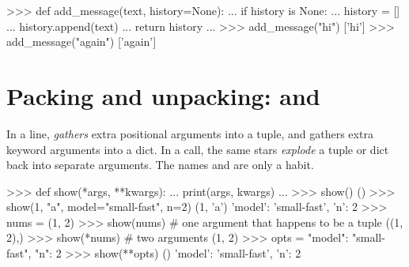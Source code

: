 \begin{pycode}
>>> def add_message(text, history=None):
...     if history is None:
...         history = []
...     history.append(text)
...     return history
...
>>> add_message("hi")
['hi']
>>> add_message("again")
['again']
\end{pycode}

\section{Packing and unpacking:  and }

In a  line,  \emph{gathers} extra positional arguments into a tuple, and
 gathers extra keyword arguments into a dict. In a call, the same stars
\emph{explode} a tuple or dict back into separate arguments. The names  and
 are only a habit.

\begin{center}
\end{center}

\begin{pycode}
>>> def show(*args, **kwargs):
...     print(args, kwargs)
...
>>> show()
() {}
>>> show(1, "a", model="small-fast", n=2)
(1, 'a') {'model': 'small-fast', 'n': 2}
>>> nums = (1, 2)
>>> show(nums)           # one argument that happens to be a tuple
((1, 2),) {}
>>> show(*nums)          # two arguments
(1, 2) {}
>>> opts = {"model": "small-fast", "n": 2}
>>> show(**opts)
() {'model': 'small-fast', 'n': 2}
\end{pycode}

